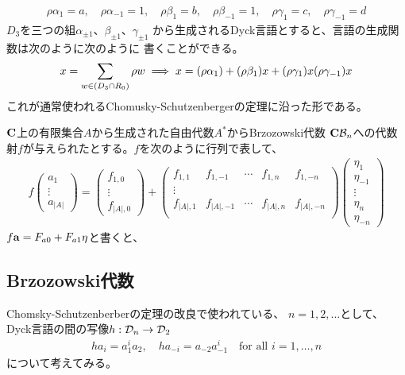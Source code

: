 {\begin{equation*}
\begin{split}
		\rho\alpha_1 = a,\quad \rho\alpha_{-1} = 1,\quad 
		\rho\beta_1 = b ,\quad \rho\beta_{-1} = 1 ,\quad 
		\rho\gamma_1 = c,\quad \rho\gamma_{-1} = d
	\end{split}\end{equation*}
	$D_3$を三つの組$\alpha_{\pm1}$、$\beta_{\pm1}$、$\gamma_{\pm1}$
	から生成されるDyck言語とすると、言語の生成関数は次のように次のように
	書くことができる。
	\begin{equation*}\begin{split}
		x = \sum_{w\in\left({D_3\cap R_0}\right)}\rho w \implies x = (\rho\alpha_1) 
			+ (\rho\beta_1)x + (\rho\gamma_1)x(\rho\gamma_{-1})x
	\end{split}\end{equation*}
	これが通常使われるChomusky-Schutzenbergerの定理に沿った形である。

	$\mathbf{C}$上の有限集合$A$から生成された自由代数$A^*$からBrzozowski代数
	$\mathbf{C}{{\mathcal{B}}}_n$への代数射$f$が与えられたとする。$f$を次のように行列で表して、
	\begin{equation*}\begin{split}
		f\begin{pmatrix}
			a_1 \\ \vdots \\ a_{|A|}
		\end{pmatrix} = \begin{pmatrix}
			f_{1,0} \\ \vdots \\ f_{|A|,0}
		\end{pmatrix} + \begin{pmatrix}
			f_{1,1} & f_{1,-1} & \cdots & f_{1,n} & f_{1,-n} \\
			\vdots \\
			f_{|A|,1} & f_{|A|,-1} & \cdots & f_{|A|,n} & f_{|A|,-n} \\
		\end{pmatrix}\begin{pmatrix}
			\eta_1 \\ \eta_{-1} \\ \vdots \\ \eta_{n} \\ \eta_{-n}
		\end{pmatrix}
	\end{split}\end{equation*}
	$f{\mathbf{a}}=F_{a0}+F_{a1}{\mathbf{\eta}}$と書くと、
\subsection{Brzozowski代数}\label{s2:Brzozowski代数} %
	Chomsky-Schutzenberberの定理の改良\cite{book1976}で使われている、
	$n=1,2,\dots$として、Dyck言語の間の写像$h:{{\mathcal{D}}}_n\to{\ensuremath{{\mathcal{D}}}}_2$
	\begin{equation*}\begin{split}
		ha_i = a_1^ia_2,\quad ha_{-i} = a_{-2}a_{-1}^i
		\quad\text{for all } i=1,\dots,n
	\end{split}\end{equation*}
	について考えてみる。

}
